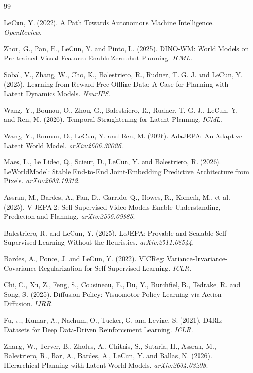 
\begin{thebibliography}{99}

LeCun, Y. (2022). A Path Towards Autonomous Machine Intelligence. \textit{OpenReview}.

Zhou, G., Pan, H., LeCun, Y. and Pinto, L. (2025). DINO-WM: World Models on Pre-trained Visual
Features Enable Zero-shot Planning. \textit{ICML}.

Sobal, V., Zhang, W., Cho, K., Balestriero, R., Rudner, T. G. J. and LeCun, Y. (2025).
Learning from Reward-Free Offline Data: A Case for Planning with Latent Dynamics Models.
\textit{NeurIPS}.

Wang, Y., Bounou, O., Zhou, G., Balestriero, R., Rudner, T. G. J., LeCun, Y. and Ren, M.
(2026). Temporal Straightening for Latent Planning. \textit{ICML}.

Wang, Y., Bounou, O., LeCun, Y. and Ren, M. (2026). AdaJEPA: An Adaptive Latent World Model.
\textit{arXiv:2606.32026}.

Maes, L., Le Lidec, Q., Scieur, D., LeCun, Y. and Balestriero, R. (2026). LeWorldModel:
Stable End-to-End Joint-Embedding Predictive Architecture from Pixels.
\textit{arXiv:2603.19312}.

Assran, M., Bardes, A., Fan, D., Garrido, Q., Howes, R., Komeili, M., et al. (2025). V-JEPA 2:
Self-Supervised Video Models Enable Understanding, Prediction and Planning.
\textit{arXiv:2506.09985}.

Balestriero, R. and LeCun, Y. (2025). LeJEPA: Provable and Scalable Self-Supervised Learning
Without the Heuristics. \textit{arXiv:2511.08544}.

Bardes, A., Ponce, J. and LeCun, Y. (2022). VICReg: Variance-Invariance-Covariance
Regularization for Self-Supervised Learning. \textit{ICLR}.

Chi, C., Xu, Z., Feng, S., Cousineau, E., Du, Y., Burchfiel, B., Tedrake, R. and Song, S.
(2025). Diffusion Policy: Visuomotor Policy Learning via Action Diffusion. \textit{IJRR}.

Fu, J., Kumar, A., Nachum, O., Tucker, G. and Levine, S. (2021). D4RL: Datasets for Deep
Data-Driven Reinforcement Learning. \textit{ICLR}.

Zhang, W., Terver, B., Zholus, A., Chitnis, S., Sutaria, H., Assran, M., Balestriero, R.,
Bar, A., Bardes, A., LeCun, Y. and Ballas, N. (2026). Hierarchical Planning with Latent World
Models. \textit{arXiv:2604.03208}.


\end{thebibliography}
